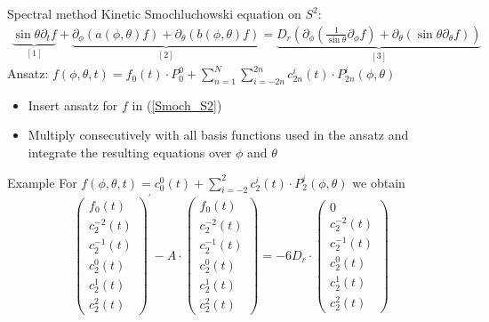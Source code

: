 \begin{frame}{Spectral method}
	\scriptsize
	Kinetic Smochluchowski equation on $S^2$:
	\begin{align}
		\underbrace{\sin \theta \partial_t f}_{[1]} + \underbrace{\partial_\phi\left(a(\phi, \theta) f\right)+\partial_\theta\left(b(\phi, \theta) f\right)}_{[2]} = \underbrace{D_r \left(\partial_\phi\left(\frac{1}{\sin \theta} \partial_\phi f\right)+\partial_\theta\left(\sin \theta \partial_\theta f\right)\right)}_{[3]} \label{Smoch_S2}
	\end{align}	
	Ansatz: $f(\phi, \theta, t) = f_0(t) \cdot P_0^0 + \sum_{n=1}^{N} \sum_{i=-2n}^{2n} c^i_{2n}(t) \cdot P^i_{2n}(\phi, \theta)$
 	\vspace{12pt}
 	\begin{itemize}
 		\item Insert ansatz for $f$ in (\ref{Smoch_S2}) 
 		\item Multiply consecutively with all basis functions used in the ansatz and integrate the resulting equations over $\phi$ and $\theta$
 	\end{itemize}
\end{frame}

\begin{frame}{Example}
	\scriptsize
	For  $f(\phi, \theta, t) = c^0_0(t) + \sum_{i=-2}^{2} c^i_{2}(t) \cdot P^i_{2}(\phi, \theta)$ we obtain
		\begin{equation}
		\left(\begin{array}{c}
			f_0(t) \\
			c_2^{-2}(t) \\
			c_2^{-1}(t) \\
			c_2^0(t) \\
			c_2^1(t) \\
			c_2^2(t)
		\end{array}\right)^{\prime} - A \cdot
		\left(\begin{array}{c}
			f_0(t) \\
			c_2^{-2}(t) \\
			c_2^{-1}(t) \\
			c_2^0(t) \\
			c_2^1(t) \\
			c_2^2(t)
		\end{array}\right) = -6 D_r \cdot
		\left(\begin{array}{c}
			0 \\
			c^{-2}_2(t) \\
			c_2^{-1}(t) \\
			c_2^0(t) \\
			c_2^1(t) \\
			c_2^2(t)
		\end{array}\right)
	\end{equation}
\end{frame}


